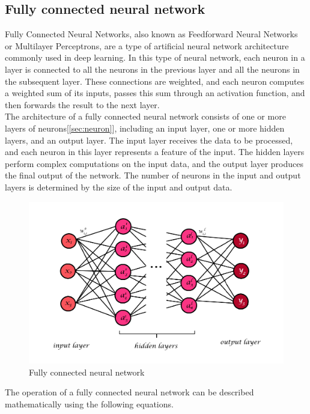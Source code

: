 \documentclass[a4paper]{sapthesis}
\begin{document}
\subsection{Fully connected neural network}
Fully Connected Neural Networks, also known as Feedforward Neural Networks
or Multilayer Perceptrons, are a type of artificial neural network 
architecture commonly used in deep learning. In this type of neural network,
 each neuron in a layer is connected to all the neurons in the previous 
 layer and all the neurons in the subsequent layer. These connections are 
 weighted, and each neuron computes a weighted sum of its inputs, passes
  this sum through an activation function, and then forwards the result to
 the next layer.\newline \\
The architecture of a fully connected neural network consists of one or
 more layers of neurons[\ref{sec:neuron}], including an input layer, one or more hidden 
 layers, and an output layer. The input layer receives the data to be
  processed, and each neuron in this layer represents a feature of the 
  input. The hidden layers perform complex computations on the input data,
and the output layer produces the final output of the network. The 
number of neurons in the input and output layers is determined by the
size of the input and output data.
\begin{figure}[h]
\includegraphics[scale=0.5]{fully_connected_nn}
\centering
\caption{Fully connected neural network}\label{fig:fully_connected}

\end{figure}

The operation of a fully connected neural network can be described 
mathematically using the following equations.
\end{document}
